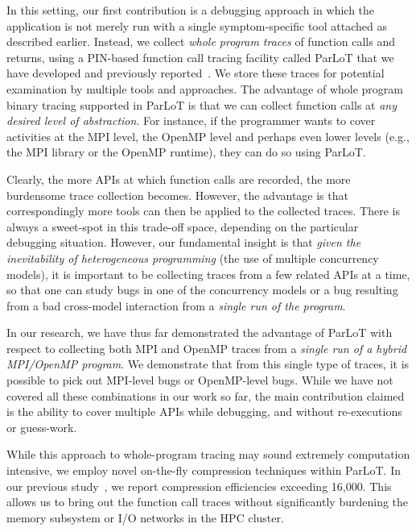 In this setting, our first contribution is
a debugging approach in which the application is not merely
run with a single symptom-specific tool attached as described earlier.
%
Instead, we collect {\em whole program traces} of function calls
and returns, using a PIN-based function call tracing facility called
ParLoT that we have developed and previously reported~\cite{parlot-paper}.
%
We store these traces for potential examination by multiple tools
and approaches.
%
The advantage of whole program binary tracing supported
in ParLoT is that we can
collect function calls at {\em any desired level of abstraction}.
%
For instance, if the programmer wants to cover activities at the
MPI level, the OpenMP level and perhaps even lower levels (e.g., the
MPI library or the OpenMP runtime), they can do so using ParLoT.


Clearly, the more APIs at which function calls are recorded, the
more burdensome trace collection becomes.
%
However, the advantage is that correspondingly
more tools can then be applied to
the collected traces.
%
There is always a sweet-spot in this trade-off space,
depending on the particular debugging situation.
%
However, our fundamental insight is that {\em given the
inevitability of heterogeneous programming} (the use of multiple
concurrency models), it is important to
be collecting traces from a few related APIs at a time, so that
one can study bugs in one of the concurrency models or a bug
resulting from a bad cross-model interaction
from a {\em single run of the program}.


In our research, we have thus far demonstrated the advantage of
ParLoT with respect to collecting both MPI and OpenMP traces
from a {\em single run of a hybrid MPI/OpenMP program}.
%
We demonstrate that from this single type of traces, it is possible
to pick out MPI-level bugs or OpenMP-level bugs.
%
While we have not covered all these combinations in our work
so far, the main contribution claimed is the ability to
cover multiple APIs while debugging, and without re-executions or
guess-work.


While this approach to whole-program tracing
may sound extremely computation intensive, we employ
novel on-the-fly compression techniques within ParLoT.
%
In our previous study~\cite{parlot-paper}, we report compression
efficiencies exceeding 16,000.
%
This allows us to bring out the function call traces without
significantly burdening the memory subsystem or I/O networks in the HPC cluster.


